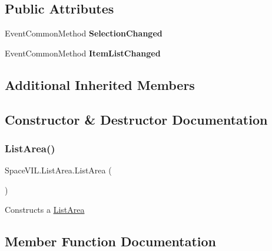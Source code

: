 \subsection*{Public Attributes}
\begin{DoxyCompactItemize}
\item 
\mbox{\label{class_space_v_i_l_1_1_list_area_abc77028057292a1e4bd149a4ab5e78ff}} 
Event\+Common\+Method {\bfseries Selection\+Changed}
\item 
\mbox{\label{class_space_v_i_l_1_1_list_area_a30e7266ebd685af3f12f386250b07689}} 
Event\+Common\+Method {\bfseries Item\+List\+Changed}
\end{DoxyCompactItemize}
\subsection*{Additional Inherited Members}


\subsection{Constructor \& Destructor Documentation}
\mbox{\label{class_space_v_i_l_1_1_list_area_a9ff09f668b7bbb22943905402aaa5938}} 
\subsubsection{\texorpdfstring{List\+Area()}{ListArea()}}
{\footnotesize\ttfamily Space\+V\+I\+L.\+List\+Area.\+List\+Area (\begin{DoxyParamCaption}{ }\end{DoxyParamCaption})\hspace{0.3cm}{\ttfamily [inline]}}



Constructs a \mbox{\hyperlink{class_space_v_i_l_1_1_list_area}{List\+Area}} 



\subsection{Member Function Documentation}
\mbox{\label{class_space_v_i_l_1_1_list_area_a31bfa40ca257cb8d2709f1b0b15fea71}} 
